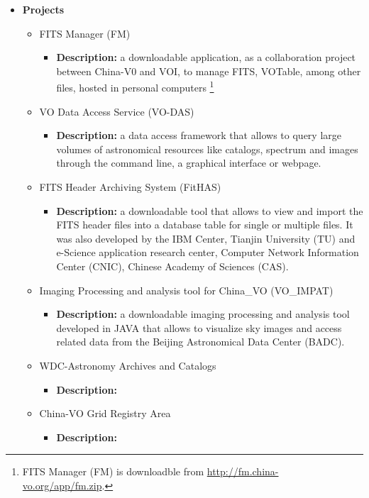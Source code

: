 \begin{itemize}
\item \textbf{Projects}
\begin{itemize}
\item FITS Manager (FM)
\begin{itemize}
\item \textbf{Description:} a downloadable application, as a collaboration
project between China-V0 and VOI, to manage FITS, VOTable, among other files,
hosted in personal computers \footnote{FITS Manager (FM) is downloadble from
\url{http://fm.china-vo.org/app/fm.zip}.} 
\end{itemize}
\item VO Data Access Service (VO-DAS)
\begin{itemize}
\item \textbf{Description:} a data access framework that allows to query large
volumes of astronomical resources like catalogs, spectrum and images through the
command line, a graphical interface or webpage.
\end{itemize}
\item FITS Header Archiving System (FitHAS)
\begin{itemize}
\item \textbf{Description:} a downloadable tool that allows to view and import
the FITS header files into a database table for single or multiple files. It was
also developed by the IBM Center, Tianjin University (TU) and e-Science
application research center, Computer Network Information Center (CNIC), Chinese
Academy of Sciences (CAS).
\end{itemize}
\item Imaging Processing and analysis tool for China\_VO (VO\_IMPAT)
\begin{itemize}
\item \textbf{Description:} a downloadable imaging processing and analysis tool
developed in JAVA that allows to visualize sky images and access related data
from the Beijing Astronomical Data Center (BADC). 
\end{itemize}
\item WDC-Astronomy Archives and Catalogs
\begin{itemize}
\item \textbf{Description:}
\end{itemize}
\item China-VO Grid Registry Area
\begin{itemize}
\item \textbf{Description:}
\end{itemize}

\end{itemize}
\end{itemize}
